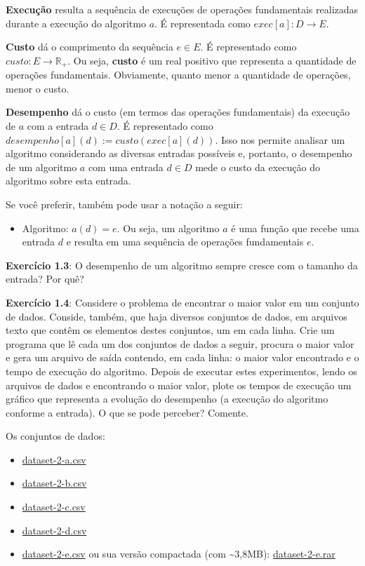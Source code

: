\documentclass{article}
\begin{document}
\textbf{Execução} resulta a sequência de execuções de operações
fundamentais realizadas durante a execução do algoritmo \(a\). É
representada como \(exec[a] : D \rightarrow E\).

\textbf{Custo} dá o comprimento da sequência \(e \in E\). É representado
como \(custo : E \rightarrow \mathbb{R}_+\). Ou seja, \textbf{custo} é
um real positivo que representa a quantidade de operações fundamentais.
Obviamente, quanto menor a quantidade de operações, menor o custo.

\textbf{Desempenho} dá o custo (em termos das operações fundamentais) da
execução de \(a\) com a entrada \(d \in D\). É representado como
\(desempenho[a](d) := custo( exec[a](d) )\). Isso nos permite analisar
um algoritmo considerando as diversas entradas possíveis e, portanto, o
desempenho de um algoritmo \(a\) com uma entrada \(d \in D\) mede o
custo da execução do algoritmo sobre esta entrada.

Se você preferir, também pode usar a notação a seguir:

\begin{itemize}
\itemsep1pt\parskip0pt
\item
  Algoritmo: \(a(d) = e\). Ou seja, um algoritmo \(a\) é uma função que
  recebe uma entrada \(d\) e resulta em uma sequência de operações
  fundamentais \(e\).
\end{itemize}

\textbf{Exercício 1.3}: O desempenho de um algoritmo sempre cresce com o
tamanho da entrada? Por quê?

\textbf{Exercício 1.4}: Considere o problema de encontrar o maior valor
em um conjunto de dados. Conside, também, que haja diversos conjuntos de
dados, em arquivos texto que contêm os elementos destes conjuntos, um em
cada linha. Crie um programa que lê cada um dos conjuntos de dados a
seguir, procura o maior valor e gera um arquivo de saída contendo, em
cada linha: o maior valor encontrado e o tempo de execução do algoritmo.
Depois de executar estes experimentos, lendo os arquivos de dados e
encontrando o maior valor, plote os tempos de execução um gráfico que
representa a evolução do desempenho (a execução do algoritmo conforme a
entrada). O que se pode perceber? Comente.

Os conjuntos de dados:

\begin{itemize}
\itemsep1pt\parskip0pt
\item
  \url{dataset-2-a.csv}
\item
  \url{dataset-2-b.csv}
\item
  \url{dataset-2-c.csv}
\item
  \url{dataset-2-d.csv}
\item
  \url{dataset-2-e.csv} ou sua versão compactada (com
  \textasciitilde{}3,8MB): \url{dataset-2-e.rar}
\end{itemize}


    
    
    
    
\end{document}

